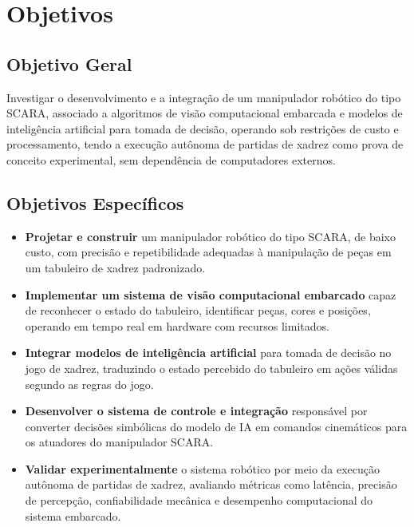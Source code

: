 \chapter*{Objetivos}

\section*{Objetivo Geral}

Investigar o desenvolvimento e a integração de um manipulador robótico do tipo SCARA, associado a algoritmos de visão computacional embarcada e modelos de inteligência artificial para tomada de decisão, operando sob restrições de custo e processamento, tendo a execução autônoma de partidas de xadrez como prova de conceito experimental, sem dependência de computadores externos.

\section*{Objetivos Específicos}

\begin{itemize}
\item \textbf{Projetar e construir} um manipulador robótico do tipo SCARA, de baixo custo, com precisão e repetibilidade adequadas à manipulação de peças em um tabuleiro de xadrez padronizado.

\item \textbf{Implementar um sistema de visão computacional embarcado} capaz de reconhecer o estado do tabuleiro, identificar peças, cores e posições, operando em tempo real em hardware com recursos limitados.

\item \textbf{Integrar modelos de inteligência artificial} para tomada de decisão no jogo de xadrez, traduzindo o estado percebido do tabuleiro em ações válidas segundo as regras do jogo.

\item \textbf{Desenvolver o sistema de controle e integração} responsável por converter decisões simbólicas do modelo de IA em comandos cinemáticos para os atuadores do manipulador SCARA.

\item \textbf{Validar experimentalmente} o sistema robótico por meio da execução autônoma de partidas de xadrez, avaliando métricas como latência, precisão de percepção, confiabilidade mecânica e desempenho computacional do sistema embarcado.
\end{itemize}